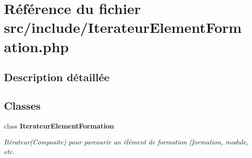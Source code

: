 \section{Référence du fichier src/include/IterateurElementFormation.php}
\label{_iterateur_element_formation_8php}


\subsection{Description détaillée}


\subsection*{Classes}
\begin{CompactItemize}
\item 
class {\bf IterateurElementFormation}
\begin{CompactList}\small\item\em Itérateur(Composite) pour parcourir un élément de formation (formation, module, etc. \item\end{CompactList}\end{CompactItemize}

